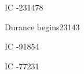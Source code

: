 \begin{comment}
\section{\Ophidians}
\end{comment}

\newcommand{\Sethican}         {Sethican\xspace}
\newcommand{\Sethicus}         {Sethicus\xspace}
\newcommand{\ValcanSethicus}   {\Valcan{} Sethicus\xspace}
\newcommand{\VardredSethicus}  {\Valcan{} Sethicus\xspace}
\newcommand{\Vardred}          {\Valcan}
\newcommand{\Valcan}           {Valcan\xspace}

\newcommand{\Hesherritan}      {Hesherritan\xspace}
      {IC} {-231478}

\newcommand{\Ishtacca}         {Ishtacca\xspace}
         {Durance begins}{23143}

\newcommand{\Nasshikerr}       {Nasshiker\xspace}
       {IC} {-91854}

\newcommand{\NathRamos}        {Nath Ramos\xspace}

\newcommand{\ZeethanKraal}     {Zeethan \Kraal}
\newcommand{\Kraal}            {Kraal\xspace}
    {IC} {-77231}








\begin{comment}
\section{\Dragons}
\end{comment}



\begin{comment}
\subsection{\Firstgendragons}
\end{comment}

\newcommand{\HesodNerga}                  {Chesod-Nerga\xspace}
\newcommand{\HesodN}                      {Chesod-Nerga\xspace}

\newcommand{\Tiamat}                      {T\ydiphthong rasshana\xspace}
\newcommand{\TyarithXserasshana}          {\Tyarith \Xserasshana}
\newcommand{\Tyarith}                     {Dzairith\xspace}
\newcommand{\Xserasshana}                 {\Tiamat}
\newcommand{\Kserasshana}                 {\Tiamat}
\newcommand{\Tyrasshana}                  {\Tiamat}

